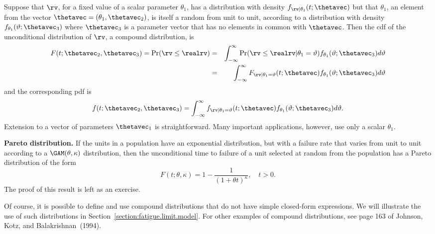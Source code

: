 Suppose that $\rv$, for a fixed value of a scalar parameter
$\theta_{1}$, has a distribution with density
$f_{\rv|\theta_{1}}(t;\thetavec)$ but that $\theta_{1}$, an element
from the vector $\thetavec=(\theta_{1},\thetavec_{2})$, is itself a
random from unit to unit, according to a distribution with density
$f_{\theta_{1}}(\vartheta;\thetavec_{3})$ where $\thetavec_{3}$ is a
parameter vector that has no elements in common with $\thetavec$. Then
the cdf of the unconditional distribution of $\rv$, a compound
distribution, is
\begin{eqnarray*}
F(t;\thetavec_{2},\thetavec_{3}) =
\Pr(\rv  \leq \realrv) 
	&=& \int_{-\infty}^{\infty} \Pr(\rv  \leq \realrv
|\theta_{1}=\vartheta ) f_{\theta_{1}}(\vartheta;\thetavec_{3})
d\vartheta\\ 
&=&\int_{-\infty}^{\infty}F_{\rv|\theta_{1}=\vartheta}(t;\thetavec)
f_{\theta_{1}}(\vartheta;\thetavec_{3}) d\vartheta
\end{eqnarray*}
and the corresponding pdf is
\begin{displaymath}
f(t;\thetavec_{2},\thetavec_{3}) =
\int_{-\infty}^{\infty}f_{\rv|\theta_{1}=\vartheta}(t;\thetavec)
f_{\theta_{1}}(\vartheta;\thetavec_{3}) d\vartheta.
\end{displaymath}
Extension to a vector of parameters $\thetavec_{1}$ is
straightforward.  Many important applications, however, use only a
scalar $\theta_{1}$.
\begin{example}
\label{example:pareto.dis}
{\bf Pareto distribution.} If the units in a population have an
exponential distribution, but with a failure rate that varies from unit to
unit according to a $\GAM(\theta,\kappa)$
distribution, then the
unconditional time to failure of a unit selected at random from the
population has a Pareto distribution of the form
\begin{equation}
\label{equation:gamma.mix.of.exp}
F(t;\theta,\kappa)=
1 - \frac{1}{(1+\theta t)^{\kappa}},
\quad t > 0.
\end{equation}
The proof of this result is left as an exercise.
\end{example}
Of course, it is possible to define and use compound distributions
that do not have simple closed-form expressions.  We will illustrate
the use of such distributions in
Section~\ref{section:fatigue.limit.model}.  For other examples of
compound distributions, see page 163 of Johnson, Kotz, and
Balakrishnan~(1994).

